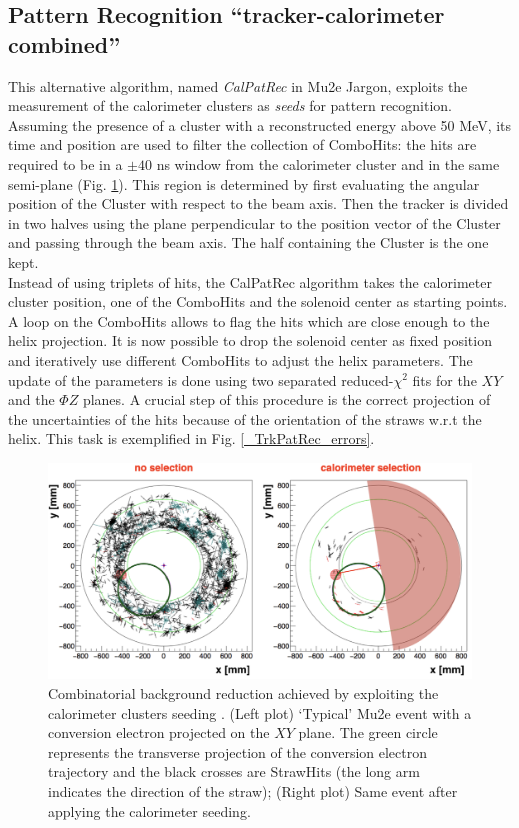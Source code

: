 \documentclass[12pt,a4paper,openright, oneside, titlepage]{book} %
\begin{document}
\subsection{Pattern Recognition ``tracker-calorimeter combined''}
This alternative algorithm, named \textit{CalPatRec} in Mu2e Jargon, 
exploits the measurement of the calorimeter clusters as \textit{seeds} for pattern recognition. 
Assuming the presence of a cluster with a reconstructed energy above 50 MeV, 
its time and position are used to filter the collection of ComboHits: 
the hits are required to be in a $\pm 40$ ns window from the calorimeter cluster 
and in the same semi-plane (Fig. \ref{_CalPatRec_semiplane}). 
This region is determined by first evaluating the angular position of the Cluster with respect to the beam axis. Then the tracker is divided in two halves using the plane perpendicular to the position vector of the Cluster and passing through the beam axis. The half containing the Cluster is the one kept.\\
Instead of using triplets of hits, the CalPatRec algorithm takes the calorimeter cluster position, one of the ComboHits and the solenoid center as starting points.
A loop on the ComboHits allows to flag the hits which are close enough to the helix projection. 
It is now possible to drop the solenoid center as fixed position and iteratively use different ComboHits to adjust the helix parameters.
The update of the parameters is done using two separated reduced-$\chi^2$ fits for the $XY$ and the $\Phi Z$ planes. 
A crucial step of this procedure is the correct projection of the uncertainties of the hits because of the orientation of the straws w.r.t the helix. This task is exemplified in Fig. \ref{_TrkPatRec_errors}.

\begin{figure}[h!]
\centering
\includegraphics[scale=0.6]{giani_CalPatRec_semiplane}
\caption[Calorimeter seeded reconstruction]{Combinatorial background reduction achieved by exploiting the calorimeter clusters seeding \cite{GianiPatRec:2020}. 
(Left plot)  `Typical' Mu2e event with a conversion electron projected on the $XY$ plane. 
The green circle represents the transverse projection of the conversion electron trajectory 
and the black crosses are StrawHits (the long arm indicates the direction of the straw); 
(Right plot) Same event after applying the calorimeter seeding.}
\label{_CalPatRec_semiplane}
\end{figure}
\end{document}
